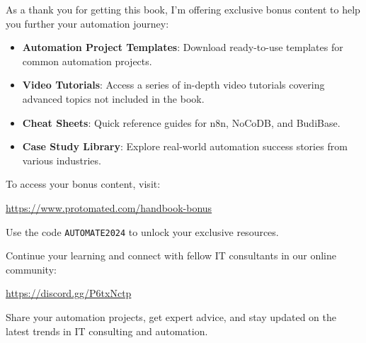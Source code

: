 
As a thank you for getting this book, I'm offering exclusive bonus content to help you further your automation journey:

\begin{itemize}
    \item \textbf{Automation Project Templates}: Download ready-to-use templates for common automation projects.
    \item \textbf{Video Tutorials}: Access a series of in-depth video tutorials covering advanced topics not included in the book.
    \item \textbf{Cheat Sheets}: Quick reference guides for n8n, NoCoDB, and BudiBase.
    \item \textbf{Case Study Library}: Explore real-world automation success stories from various industries.
\end{itemize}

To access your bonus content, visit:

\begin{center}
    \large\url{https://www.protomated.com/handbook-bonus}
\end{center}

Use the code \texttt{AUTOMATE2024} to unlock your exclusive resources.

\vspace{1cm}

\begin{tcolorbox}[colback=secondarylight,colframe=secondarydark,title=Join Our Community]
    Continue your learning and connect with fellow IT consultants in our online community:

    \begin{center}
        \large\url{https://discord.gg/P6txNctp}
    \end{center}

    Share your automation projects, get expert advice, and stay updated on the latest trends in IT consulting and automation.
\end{tcolorbox}